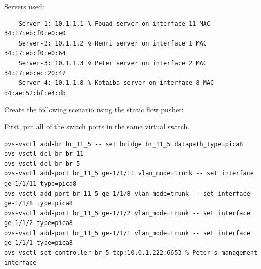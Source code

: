 \documentclass[a4paper]{article}
\begin{document}
Servers used:
\begin{verbatim}
    Server-1: 10.1.1.1 % Fouad server on interface 11 MAC 34:17:eb:f0:e0:e0
    Server-2: 10.1.1.2 % Henri server on interface 1 MAC  34:17:eb:f0:e0:64 
    Server-3: 10.1.1.3 % Peter server on interface 2 MAC 34:17:eb:ec:20:47 
    Server-4: 10.1.1.8 % Kotaiba server on interface 8 MAC d4:ae:52:bf:e4:db
\end{verbatim}

Create the following scenario using the static flow pusher:

First, put all of the switch ports in the same virtual switch.
\begin{verbatim}
ovs-vsctl add-br br_11_5 -- set bridge br_11_5 datapath_type=pica8
ovs-vsctl del-br br_11
ovs-vsctl del-br br_5
ovs-vsctl add-port br_11_5 ge-1/1/11 vlan_mode=trunk -- set interface ge-1/1/11 type=pica8
ovs-vsctl add-port br_11_5 ge-1/1/8 vlan_mode=trunk -- set interface ge-1/1/8 type=pica8
ovs-vsctl add-port br_11_5 ge-1/1/2 vlan_mode=trunk -- set interface ge-1/1/2 type=pica8
ovs-vsctl add-port br_11_5 ge-1/1/1 vlan_mode=trunk -- set interface ge-1/1/1 type=pica8
ovs-vsctl set-controller br_5 tcp:10.0.1.222:6653 % Peter's management interface
\end{verbatim}
\end{document}
